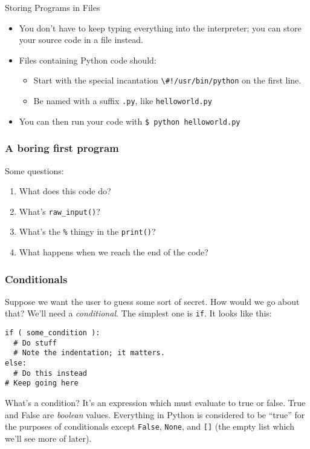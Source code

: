 \documentclass{beamer}
\begin{document}
\begin{frame}{Storing Programs in Files}
  \begin{itemize}
    \item You don't have to keep typing everything into the interpreter; you can store your source code in a file instead.
    \item Files containing Python code should: \\
    \begin{itemize}
      \item Start with the special incantation \lstinline{\#!/usr/bin/python} on the first line.
      \item Be named with a suffix \texttt{.py}, like \texttt{helloworld.py} 
    \end{itemize}
    \item You can then run your code with \texttt{\$ python helloworld.py}
  \end{itemize}
\end{frame}

\begin{frame}[fragile]
  \frametitle{A boring first program}
  
  Some questions:
  \begin{enumerate}
    \item What does this code do?
    \item What's \lstinline{raw_input()}?
    \item What's the \lstinline{%} thingy in the \lstinline{print()}?
    \item What happens when we reach the end of the code?
  \end{enumerate}
\end{frame}

\begin{frame}[fragile]
  \frametitle{Conditionals}
  Suppose we want the user to guess some sort of secret. How would we go about that?
  We'll need a \emph{conditional}. The simplest one is \lstinline{if}. It looks like this:

  \begin{lstlisting}
if ( some_condition ):
  # Do stuff
  # Note the indentation; it matters.
else:
  # Do this instead
# Keep going here
  \end{lstlisting}
  What's a condition? It's an expression which must evaluate to true or false. True and False are \emph{boolean} values.
  Everything in Python is considered to be ``true'' for the purposes of conditionals except \lstinline{False}, \lstinline{None}, and \lstinline{[]} (the empty list which we'll see more of later).
  
\end{frame}
\end{document}
